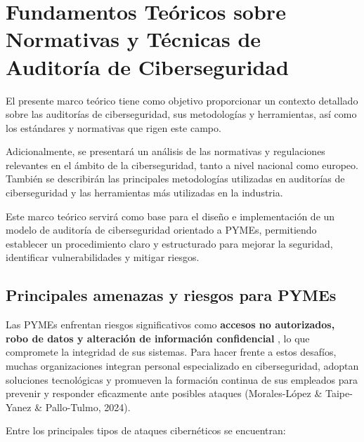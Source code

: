 \documentclass[a4paper, 10pt]{article}
\begin{document}
\clearpage































\section{Fundamentos Teóricos sobre Normativas y Técnicas de Auditoría de Ciberseguridad} %
El presente marco teórico tiene como objetivo proporcionar un contexto detallado sobre las auditorías de ciberseguridad, sus metodologías y herramientas, así como los estándares y normativas que rigen este campo.
\par\vspace{0.5cm}

Adicionalmente, se presentará un análisis de las normativas y regulaciones relevantes en el ámbito de la ciberseguridad, tanto a nivel nacional como europeo. También se describirán las principales metodologías utilizadas en auditorías de ciberseguridad y las herramientas más utilizadas en la industria.
\par\vspace{0.5cm}

Este marco teórico servirá como base para el diseño e implementación de un modelo de auditoría de ciberseguridad orientado a PYMEs, permitiendo establecer un procedimiento claro y estructurado para mejorar la seguridad, identificar vulnerabilidades y mitigar riesgos.

\subsection{Principales amenazas y riesgos para PYMEs}
Las PYMEs enfrentan riesgos significativos como \textbf{accesos no autorizados, robo de datos y alteración de información confidencial} , lo que compromete la integridad de sus sistemas. 
Para hacer frente a estos desafíos, muchas organizaciones integran personal especializado en ciberseguridad, adoptan soluciones tecnológicas y promueven la formación continua de sus empleados para prevenir y responder eficazmente ante posibles 
ataques (Morales-López \& Taipe-Yanez \& Pallo-Tulmo, 2024). \cite{vuln}
\par\vspace{0.5cm}
Entre los principales tipos de ataques cibernéticos se encuentran:
\end{document}
